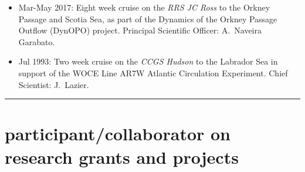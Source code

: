 \documentclass{article}
\begin{document}
\begin{itemize}[leftmargin=*]
 \item 
 Mar-May 2017: Eight week cruise on the {\it RRS JC Ross}  to the Orkney Passage and Scotia Sea,
  as part of the
  Dynamics of the Orkney Passage Outflow (DynOPO) project. Principal Scientific Officer: A.\ Naveira Garabato. 
 \item 
  Jul 1993: Two week cruise on the {\it CCGS Hudson} to the Labrador Sea in support of  the WOCE Line AR7W Atlantic Circulation Experiment. Chief Scientist: J.\ Lazier.
\end{itemize}




\noindent\rule{\textwidth}{1pt}
\vspace{-1cm}
\section*{\sc \color{Maroon}  participant/collaborator on research grants and projects}
\vspace{-.3cm}
\end{document}

